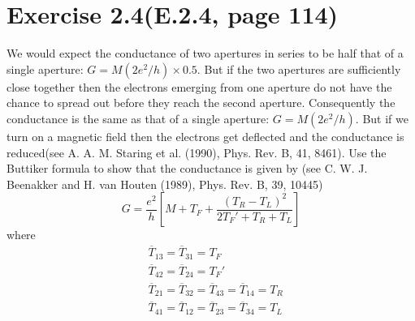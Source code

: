 \documentclass[11pt,a4paper]{article}
\theoremstyle{plain}
\theoremstyle{definition}
\theoremstyle{remark}
\begin{document}
\section*{Exercise 2.4(E.2.4, page 114)}
We would expect the conductance of two apertures in series to be half that of a single aperture: $G = M(2e^2/h) \times 0.5$. But if the two apertures are sufficiently close together then the electrons emerging from one aperture do not have the chance to spread out before they reach the second aperture. Consequently the conductance is the same as that of a single aperture: $G = M(2e^2/h)$. But if we turn on a magnetic field then the electrons get deflected and the conductance is reduced(see A. A. M. Staring et al. (1990), Phys. Rev. B, 41, 8461). Use the Buttiker formula to show that the conductance is given by (see C. W. J. Beenakker and H. van Houten (1989), Phys. Rev. B, 39, 10445)
\begin{equation*}
    G = \frac{e^2}{h}\left[ M + T_F + \frac{(T_R-T_L)^2}{2T_F' + T_R + T_L}\right]
\end{equation*}
where
\begin{equation*}
    \begin{aligned}
        & \overline{T}_{13} = \overline{T}_{31} = T_F \\
        & \overline{T}_{42} = \overline{T}_{24} = T_F' \\
        & \overline{T}_{21} = \overline{T}_{32} = \overline{T}_{43} = \overline{T}_{14} = T_R \\
        & \overline{T}_{41} = \overline{T}_{12} = \overline{T}_{23} = \overline{T}_{34} = T_L
    \end{aligned}
\end{equation*}
\end{document}
